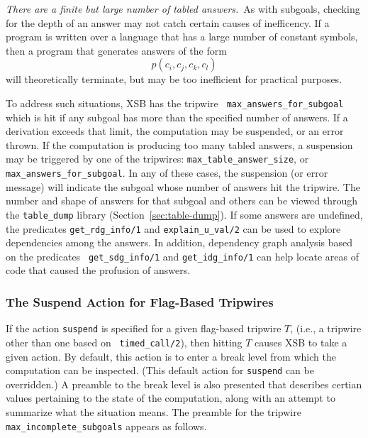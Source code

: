 \item {\em There are a finite but large number of tabled answers.}\ As
  with subgoals, checking for the depth of an answer may not catch
  certain causes of inefficency. If a program is written over a
  language that has a large number of constant symbols, then a program
  that generates answers of the form
\[
   p(c_i,c_j,c_k,c_l)
\]
  will theoretically terminate, but may be too inefficient for
  practical purposes.  

  To address such situations, XSB has the tripwire {\tt
    max\_answers\_for\_subgoal} which is hit if any subgoal has more
  than the specified number of answers.  If a derivation exceeds that
  limit, the computation may be suspended, or an error thrown.
%
  If the computation is producing too
 many tabled answers, a suspension may be triggered by one of the
 tripwires: {\tt max\_table\_answer\_size}, or {\tt
 max\_answers\_for\_subgoal}.  In any of these cases, the suspension
 (or error message) will indicate the subgoal whose number of answers
 hit the tripwire.  The number and shape of answers for that subgoal
 and others can be viewed through the {\tt table\_dump} library
 (Section~\ref{sec:table-dump}).  If some answers are undefined, the
 predicates {\tt get\_rdg\_info/1} and {\tt explain\_u\_val/2} can be
 used to explore dependencies among the answers.  In addition,
 dependency graph analysis based on the predicates {\tt
 get\_sdg\_info/1} and {\tt get\_idg\_info/1} can help locate areas of
 code that caused the profusion of answers.

 \ei

\subsubsection{The Suspend Action for Flag-Based Tripwires}

If the action {\tt suspend} is specified for a given flag-based
 tripwire $T$, (i.e., a tripwire other than one based on {\tt
 timed\_call/2}), then hitting $T$ causes XSB to take a given action.
  By default, this action is to enter a break level from which the
 computation can be inspected. (This default action for {\tt suspend}
 can be overridden.)  A preamble to the break level is also presented
 that describes certian values pertaining to the state of the
 computation, along with an attempt to summarize what the situation
 means.  The preamble for the tripwire {\tt max\_incomplete\_subgoals}
 appears as follows.

